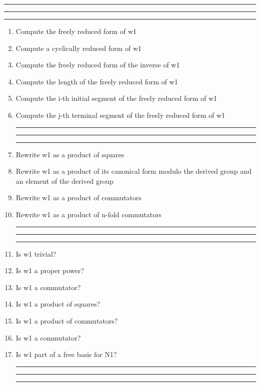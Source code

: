 
\bigskip
\hrule\hrule\hrule

\begin{enumerate}

\item Compute the freely reduced form of w1

\item Compute a cyclically reduced form of w1

\item Compute the freely reduced form of the inverse of w1

\item Compute the length of the freely reduced form of w1

\item Compute the i-th initial segment of the freely reduced form of w1

\item Compute the j-th terminal segment of the freely reduced form of w1

\bigskip
\hrule\hrule\hrule

\item Rewrite w1 as a product of squares

\item Rewrite w1 as a product of its canonical form modulo the derived group
and an element of the derived group

\item Rewrite w1 as a product of commutators

\item Rewrite w1 as a product of n-fold commutators

\bigskip
\hrule\hrule\hrule

\item Is w1 trivial?

\item Is w1 a proper power?

\item Is w1 a commutator?

\item Is w1 a product of squares?

\item Is w1 a product of commutators?

\item Is w1 a commutator?

\item Is w1 part of a free basis for N1?

\bigskip
\hrule\hrule\hrule


\end{enumerate}
